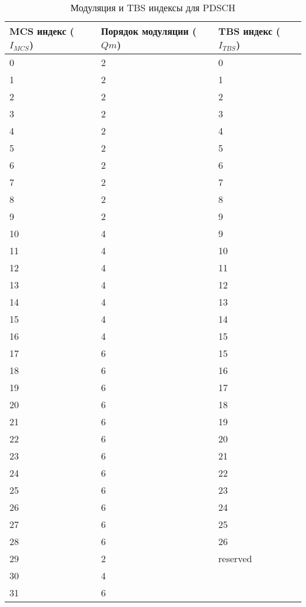 \begin{table} [htb]
  \centering
\parbox{15cm}{\caption{Модуляция и TBS индексы для PDSCH}\label{TBindex}}
    \begin{tabular}{|l|l|l|}
    \hline
     MCS индекс ($I_{MCS}$) &  Порядок модуляции ($Qm$) &  TBS индекс ($I_{TBS}$)    \\ \hline
    0      & 2    & 0         \\ \hline
    1      & 2    & 1         \\ \hline
    2      & 2    & 2         \\ \hline
    3      & 2    & 3         \\ \hline
    4      & 2    & 4         \\ \hline
    5      & 2    & 5         \\ \hline
    6      & 2    & 6         \\ \hline
    7      & 2    & 7         \\ \hline
    8      & 2    & 8         \\ \hline
    9      & 2    & 9         \\ \hline
    10     & 4    & 9         \\ \hline
    11     & 4    & 10        \\ \hline
    12     & 4    & 11        \\ \hline
    13     & 4    & 12        \\ \hline
    14     & 4    & 13        \\ \hline
    15     & 4    & 14        \\ \hline
    16     & 4    & 15        \\ \hline
    17     & 6    & 15        \\ \hline
    18     & 6    & 16        \\ \hline
    19     & 6    & 17        \\ \hline
    20     & 6    & 18        \\ \hline
    21     & 6    & 19        \\ \hline
    22     & 6    & 20        \\ \hline
    23     & 6    & 21        \\ \hline
    24     & 6    & 22        \\ \hline
    25     & 6    & 23        \\ \hline
    26     & 6    & 24        \\ \hline
    27     & 6    & 25        \\ \hline
    28     & 6    & 26        \\ \hline
    29     & 2    &  reserved \\
    30     & 4    & ~         \\
    31     & 6    & ~         \\ \hline
    \end{tabular}
\end{table}

